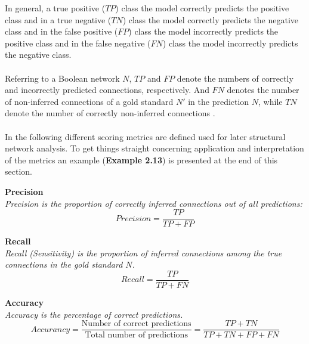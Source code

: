 In general, a true positive ($TP$) class the model correctly predicts the positive class and in a true negative ($TN$) class the model correctly predicts the negative class and in the false positive ($FP$) class the model incorrectly predicts the positive class and in the false negative ($FN$) class the model incorrectly predicts the negative class.
\\\\ 
Referring to a Boolean network $N$, $TP$ and $FP$ denote the numbers of correctly and incorrectly predicted connections, respectively. And $FN$ denotes the number of non-inferred connections of a gold standard $N'$ in the prediction $N$, while $TN$ denote the number of correctly non-inferred connections \citep{Barman.2017}.
\\\\ 
In the following different scoring metrics are defined used for later structural network analysis. To get things straight concerning application and interpretation of the metrics an example (\textbf{Example 2.13}) is presented at the end of this section.


\begin{defn}\textbf{Precision}\\ 
\textit{Precision is the proportion of correctly inferred connections out of all predictions:}\\
\begin{equation}
Precision=\frac{TP}{TP+FP}
\end{equation}
\end{defn}
\citep{Barman.2017}

\newpage

\begin{defn}\textbf{Recall}\\
\textit{Recall (Sensitivity) is the proportion of inferred connections among the true connections in the gold standard $N$.}\\
\begin{equation}
Recall=\frac{TP}{TP+FN}
\end{equation}
\end{defn}
\citep{Barman.2017}


\begin{defn}\textbf{Accuracy\\}
\textit{Accuracy is the percentage of correct predictions.}
\begin{equation}
Accurancy=\frac{\text{Number of correct predictions}}{\text{Total number of predictions}}= \frac{TP+TN}{TP+TN+FP+FN}
\end{equation}
\end{defn}

